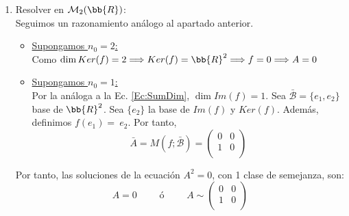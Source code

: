 \begin{ejercicio}
\begin{enumerate}
       \item Resolver en $\mathcal{M}_2(\bb{R})$:\\
        Seguimos un razonamiento análogo al apartado anterior.
       \begin{itemize}
           \item \underline{Supongamos $n_0 = 2$:}\\
           Como $\dim Ker(f)=2 \Longrightarrow Ker(f) = \bb{R}^2 \Longrightarrow f=0 \Longrightarrow A=0$
    
           \item \underline{Supongamos $n_0 = 1$:}\\
           Por la análoga a la Ec. \ref{Ec:SumDim}, $\dim Im(f)=1$. Sea $\bar{\mathcal{B}}=\{e_1, e_2\}$ base de $\bb{R}^2$. Sea $\{e_2\}$ la base de $Im(f)$ y $Ker(f)$. Además, definimos $f(e_1)=~e_2$.
           Por tanto,
           $$\bar{A} = M(f; \bar{\mathcal{B}}) = \left( \begin{array}{cc}
               0 & 0\\
               1 & 0\\
           \end{array}\right)$$
       \end{itemize}
    
       Por tanto, las soluciones de la ecuación $A^2 = 0$, con 1 clase de semejanza, son:
       \begin{equation*}
           A = 0
           \qquad \text{ ó } \qquad
           A\sim \left( \begin{array}{cc}
               0 & 0\\
               1 & 0\\
           \end{array}\right)
       \end{equation*}
       
    \end{enumerate}
    
\end{ejercicio}

